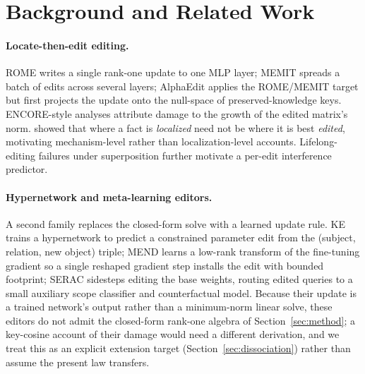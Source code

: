 \section{Background and Related Work}
\label{sec:related}

\paragraph{Locate-then-edit editing.} ROME \citep{meng2022rome} writes a
single rank-one update to one MLP layer; MEMIT \citep{meng2023memit} spreads a
batch of edits across several layers; AlphaEdit \citep{fang2025alphaedit}
applies the ROME/MEMIT target but first projects the update onto the
null-space of preserved-knowledge keys. ENCORE-style analyses
\citep{gupta2024encore} attribute damage to the growth of the edited matrix's
norm. \citet{hase2023doeslocalization} showed that where a fact is
\emph{localized} need not be where it is best \emph{edited}, motivating
mechanism-level rather than localization-level accounts. Lifelong-editing
failures under superposition \citep{superposition2024} further motivate a
per-edit interference predictor.

\paragraph{Hypernetwork and meta-learning editors.} A second family replaces
the closed-form solve with a learned update rule. KE \citep{decao2021ke} trains
a hypernetwork to predict a constrained parameter edit from the (subject,
relation, new object) triple; MEND \citep{mitchell2022mend} learns a low-rank
transform of the fine-tuning gradient so a single reshaped gradient step
installs the edit with bounded footprint; SERAC \citep{mitchell2022serac}
sidesteps editing the base weights, routing edited queries to a small auxiliary
scope classifier and counterfactual model. Because their update is a trained
network's output rather than a minimum-norm linear solve, these editors do not
admit the closed-form rank-one algebra of Section~\ref{sec:method}; a
key-cosine account of their damage would need a different derivation, and we
treat this as an explicit extension target (Section~\ref{sec:dissociation})
rather than assume the present law transfers.

